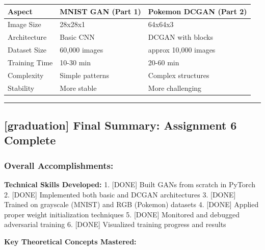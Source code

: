 \documentclass[11pt]{article}
\begin{document}
{\def\LTcaptype{none} %
\begin{longtable}[]{@{}lll@{}}
\toprule\noalign{}
Aspect & MNIST GAN (Part 1) & Pokemon DCGAN (Part 2) \\
\midrule\noalign{}
\endhead
\bottomrule\noalign{}
\endlastfoot
Image Size & 28x28x1 & 64x64x3 \\
Architecture & Basic CNN & DCGAN with blocks \\
Dataset Size & 60,000 images & approx 10,000 images \\
Training Time & 10-30 min & 20-60 min \\
Complexity & Simple patterns & Complex structures \\
Stability & More stable & More challenging \\
\end{longtable}
}

    \begin{center}\rule{0.5\linewidth}{0.5pt}\end{center}

\subsection{{[}graduation{]} Final Summary: Assignment 6
Complete}\label{graduation-final-summary-assignment-6-complete}

\subsubsection{Overall Accomplishments:}\label{overall-accomplishments}

\textbf{Technical Skills Developed:} 1. {[}DONE{]} Built GANs from
scratch in PyTorch 2. {[}DONE{]} Implemented both basic and DCGAN
architectures 3. {[}DONE{]} Trained on grayscale (MNIST) and RGB
(Pokemon) datasets 4. {[}DONE{]} Applied proper weight initialization
techniques 5. {[}DONE{]} Monitored and debugged adversarial training 6.
{[}DONE{]} Visualized training progress and results

\textbf{Key Theoretical Concepts Mastered:}
\end{document}
